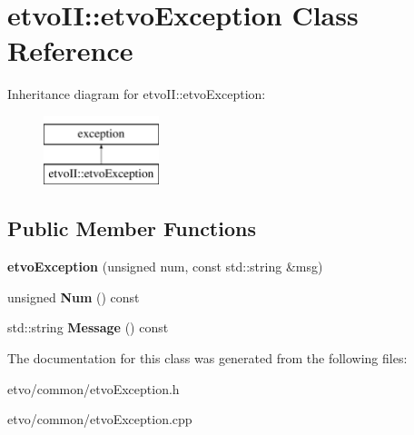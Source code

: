 \hypertarget{classetvo_i_i_1_1etvo_exception}{}\section{etvo\+II\+:\+:etvo\+Exception Class Reference}
\label{classetvo_i_i_1_1etvo_exception}
Inheritance diagram for etvo\+II\+:\+:etvo\+Exception\+:\begin{figure}[H]
\begin{center}
\leavevmode
\includegraphics[height=2.000000cm]{classetvo_i_i_1_1etvo_exception}
\end{center}
\end{figure}
\subsection*{Public Member Functions}
\begin{DoxyCompactItemize}
\item 
\mbox{\label{classetvo_i_i_1_1etvo_exception_aaf3ee1fbf5a3b7e1ee28c7760d357f33}} 
{\bfseries etvo\+Exception} (unsigned num, const std\+::string \&msg)
\item 
\mbox{\label{classetvo_i_i_1_1etvo_exception_aa9cffbb354b53bba6faa4d343c621bfa}} 
unsigned {\bfseries Num} () const
\item 
\mbox{\label{classetvo_i_i_1_1etvo_exception_aeed89d0c1ac5f4e39dc2938f8d75e822}} 
std\+::string {\bfseries Message} () const
\end{DoxyCompactItemize}


The documentation for this class was generated from the following files\+:\begin{DoxyCompactItemize}
\item 
etvo/common/etvo\+Exception.\+h\item 
etvo/common/etvo\+Exception.\+cpp\end{DoxyCompactItemize}
